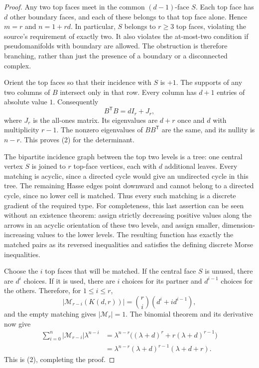 \documentclass[11pt]{article}
\newcommand{\MM}{\mathcal M}
\begin{document}
\begin{proof}
Any two top faces meet in the common $(d-1)$-face $S$.
Each top face has $d$ other boundary faces, and each of these
belongs to that top face alone. Hence $m=r$ and $n=1+rd$.
In particular, $S$ belongs to $r\ge3$ top faces, violating
the source's requirement of exactly two. It also violates the
at-most-two condition if pseudomanifolds with boundary are
allowed. The obstruction is therefore branching, rather than
just the presence of a boundary or a disconnected complex.

Orient the top faces so that their incidence with $S$ is $+1$.
The supports of any two columns of $B$ intersect only in that
row. Every column has $d+1$ entries of absolute value $1$.
Consequently
\[
 B^{\mathsf T}B=dI_r+J_r,
\]
where $J_r$ is the all-ones matrix. Its eigenvalues are
$d+r$ once and $d$ with multiplicity $r-1$.
The nonzero eigenvalues of $BB^{\mathsf T}$ are the same,
and its nullity is $n-r$. This proves (2) for the determinant.

The bipartite incidence graph between the top two levels is a
tree: one central vertex $S$ is joined to $r$ top-face vertices,
each with $d$ additional leaves. Every matching is acyclic,
since a directed cycle would give an undirected cycle in this
tree. The remaining Hasse edges point downward and cannot
belong to a directed cycle, since no lower cell is matched.
Thus every such matching is a discrete gradient of the
required type. For completeness, this last assertion can be
seen without an existence theorem: assign strictly decreasing
positive values along the arrows in an acyclic orientation of
these two levels, and assign smaller, dimension-increasing
values to the lower levels. The resulting function has exactly
the matched pairs as its reversed inequalities and satisfies
the defining discrete Morse inequalities.

Choose the $i$ top faces that will be matched. If the central
face $S$ is unused, there are $d^i$ choices. If it is used,
there are $i$ choices for its partner and $d^{i-1}$ choices
for the others. Therefore, for $1\le i\le r$,
\[
 |\MM_{r-i}(K(d,r))|=\binom ri(d^i+i d^{i-1}),             \tag{3}
\]
and the empty matching gives $|\MM_r|=1$. The binomial theorem
and its derivative now give
\begin{align*}
 \sum_{i=0}^n |\MM_{r-i}|\lambda^{n-i}
 &=\lambda^{n-r}\bigl((\lambda+d)^r
                   +r(\lambda+d)^{r-1}\bigr)\\
 &=\lambda^{n-r}(\lambda+d)^{r-1}(\lambda+d+r).
\end{align*}
This is (2), completing the proof.
\end{proof}
\end{document}
